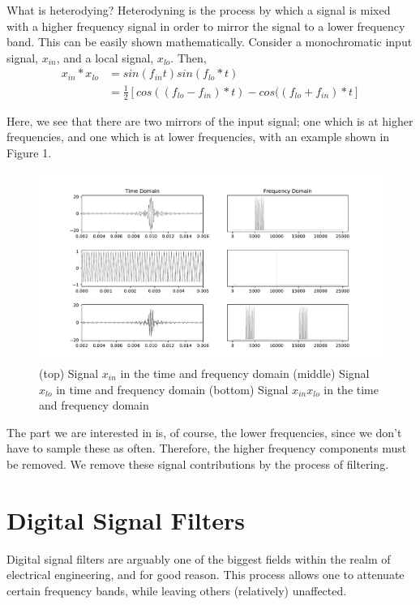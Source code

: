 \documentclass{report}
\begin{document}
What is heterodying? Heterodyning is the process by which a signal is mixed with a higher frequency signal in order to mirror the signal to a lower frequency band.  This can be easily shown mathematically.  Consider a monochromatic input signal, $x_{in}$, and a local signal, $x_{lo}$.  Then,
\begin{align}
x_{in}*x_{lo}& = sin(f_{in}t)sin(f_{lo}*t)\\
             & = \frac{1}{2}[cos((f_{lo}-f_{in})*t) - cos((f_{lo}+f_{in})*t]
\end{align}

Here, we see that there are two mirrors of the input signal; one which is at higher frequencies, and one which is at lower frequencies, with an example shown in Figure 1.  
\begin{figure}[ht]
\includegraphics[scale=.45]{Figure_1.pdf}
\caption{(top) Signal $x_{in}$ in the time and frequency domain (middle) Signal $x_{lo}$ in time and frequency domain (bottom) Signal $x_{in}x_{lo}$ in the time and frequency domain}
\end{figure}

The part we are interested in is, of course, the lower frequencies, since we don't have to sample these as often.  Therefore, the higher frequency components must be removed.  We remove these signal contributions by the process of filtering.

\section{Digital Signal Filters}

Digital signal filters are arguably one of the biggest fields within the realm of electrical engineering, and for good reason.  This process allows one to attenuate certain frequency bands, while leaving others (relatively) unaffected. 
\end{document}
